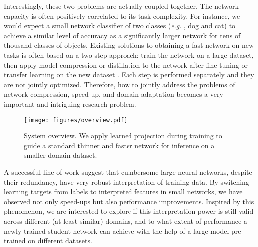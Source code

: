 \documentclass[journal]{IEEEtran}
\newcommand{\eg}{\textit{e}.\textit{g}. }
\begin{document}
Interestingly, these two problems are actually coupled together. The network capacity is often positively correlated to its task complexity. For instance, we would expect a small network classifier of two classes (\eg, dog and cat) to achieve a similar  level of accuracy as a significantly larger network for tens of thousand classes of objects. Existing solutions to obtaining a fast network on new tasks is often based on a two-step approach: train the network on a large dataset, then apply model compression or distillation to the network after fine-tuning or transfer learning on the new dataset \cite{hinton2015distilling}. 
Each step is performed separately and they are not jointly optimized.
Therefore, how to jointly address the problems of network compression, speed up, and domain adaptation becomes a very important and intriguing research problem. 

\begin{figure}[h]
\begin{center}
   \texttt{[image: figures/overview.pdf]}
\end{center}
\caption{System overview. We apply learned projection during training to guide a standard thinner and faster network for inference on a smaller domain dataset.}
\label{fig:overview}
\end{figure}

A successful line of work \cite{bucilua2006model,hinton2015distilling,romero2014fitnets, hou2016skeleton, xiong2016convolutional} suggest that cumbersome large neural networks, despite their redundancy, have very robust interpretation of training data. By switching learning targets from labels to interpreted features in small networks, we have observed not only speed-ups but also performance improvements. Inspired by this phenomenon, we are interested to explore if this interpretation power is still valid across different (at least similar) domains, and to what extent of performance a newly trained student network can achieve with the help of a large model pre-trained on different datasets. 
\end{document}
